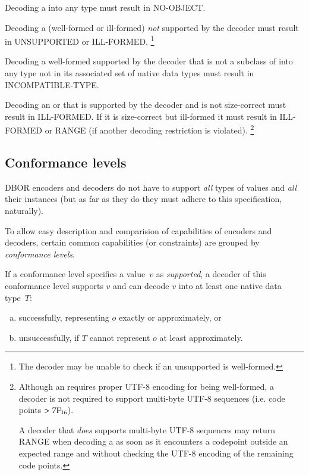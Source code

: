 Decoding a \DborNoneValue{} into any type must result in NO-OBJECT.

\medskip
Decoding a (well-formed or ill-formed) \DborValue{} \emph{not} supported by the decoder
must result in UNSUPPORTED or ILL-FORMED.%
\footnote{%
    The decoder may be unable to check if an unsupported \DborValue{} is well-formed.
}

\medskip
Decoding a well-formed \DborValue{} supported by the decoder that is not a subclass of \DborNumberValue{}
into any type not in its associated set of native data types must result in INCOMPATIBLE-TYPE.

\medskip
Decoding an \DborContainerValue{} or \DborUtfEightStringValue{} that is supported by the decoder and
is not size-correct must result in ILL-FORMED.
If it is size-correct but ill-formed it must result in ILL-FORMED or RANGE
(if another decoding restriction is violated).%
\footnote{%
    Although an \DborUtfEightStringValue{} requires proper UTF-8 encoding for being well-formed,
    a decoder is not required to support multi-byte UTF-8 sequences (i.e. code points $> \mathrm{7F}_{16}$).

    A decoder that \emph{does} supports multi-byte UTF-8 sequences
    may return RANGE when decoding a \DborUtfEightStringValue{} as soon as it encounters a codepoint outside
    an expected range and without checking the UTF-8 encoding of the remaining code points.
}


\subsection{Conformance levels}
\label{sec:conformancelevels}

DBOR encoders and decoders do not have to support \emph{all} types of values and \emph{all} their instances
(but as far as they do they must adhere to this specification, naturally).

To allow easy description and comparision of capabilities of encoders and decoders,
certain common capabilities (or constraints) are grouped by \emph{conformance levels}.

\medskip
If a conformance level specifies a value~$v$ as \emph{supported},
a decoder of this conformance level supports $v$ and can decode $v$ into at least one native data type~$T$:
\begin{enumerate}[a)]
    \item successfully, representing $o$ exactly or approximately, or
    \item unsuccessfully, if $T$ cannot represent $o$ at least approximately.
\end{enumerate}

